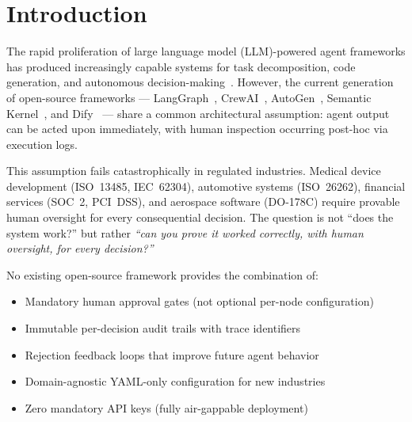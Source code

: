 \documentclass[11pt,a4paper]{article}
\begin{document}
\begin{abstract}
The system comprises ${\sim}110{,}000$ lines of production code (84K Python + 26K TypeScript), 280+ REST API endpoints, 36 React UI pages, 2{,}000+ automated tests, and 17 modular skills. Empirical evaluation across 618 Agent Gym training sessions demonstrates measurable skill improvement (average Glicko-2 rating: 1{,}492), while a 100-solution stress test across 10 industry domains validates the full PO~$\rightarrow$~SE~$\rightarrow$~Build pipeline. We report both successes and failures transparently.

\medskip
\noindent\textbf{Keywords:} multi-agent systems, human-in-the-loop, regulated AI, lean development, agent training, governance, collective intelligence
\end{abstract}

\section{Introduction}
\label{sec:intro}

The rapid proliferation of large language model (LLM)-powered agent frameworks has produced increasingly capable systems for task decomposition, code generation, and autonomous decision-making~\citep{yao2023react, shinn2023reflexion, hong2023metagpt}. However, the current generation of open-source frameworks --- LangGraph~\citep{langgraph2024}, CrewAI~\citep{crewai2024}, AutoGen~\citep{wu2023autogen}, Semantic Kernel~\citep{semantickernel2024}, and Dify~\citep{dify2024} --- share a common architectural assumption: agent output can be acted upon immediately, with human inspection occurring post-hoc via execution logs.

This assumption fails catastrophically in regulated industries. Medical device development (ISO~13485, IEC~62304), automotive systems (ISO~26262), financial services (SOC~2, PCI~DSS), and aerospace software (DO-178C) require provable human oversight for every consequential decision. The question is not ``does the system work?'' but rather \textit{``can you prove it worked correctly, with human oversight, for every decision?''}

No existing open-source framework provides the combination of:
\begin{itemize}[noitemsep]
    \item Mandatory human approval gates (not optional per-node configuration)
    \item Immutable per-decision audit trails with trace identifiers
    \item Rejection feedback loops that improve future agent behavior
    \item Domain-agnostic YAML-only configuration for new industries
    \item Zero mandatory API keys (fully air-gappable deployment)
\end{itemize}
\end{document}
